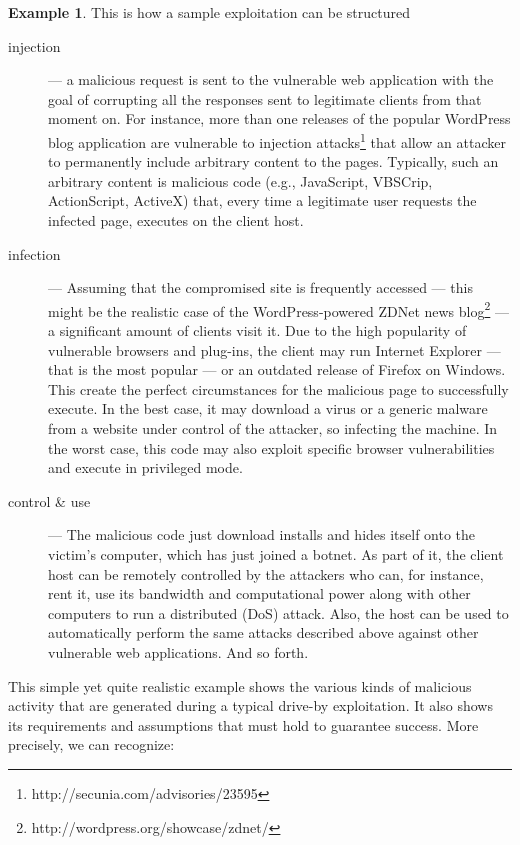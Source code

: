\documentclass[12pt]{article}
\theoremstyle{definition}
\newtheorem{example}{Example}[section]
\begin{document}
		\begin{example}
				This is how a sample exploitation can be structured
				\begin{description}
					\item [injection] --- a malicious request is sent to the vulnerable
					web application with the goal of corrupting all the responses sent
					to legitimate clients from that moment on. For instance, more than
					one releases of the popular \textsf{WordPress} blog application are
					vulnerable to injection
					attacks\footnote{http://secunia.com/advisories/23595} that allow an
					attacker to permanently include arbitrary content to the
					pages. Typically, such an arbitrary content is malicious code (e.g.,
					JavaScript, VBSCrip, ActionScript, ActiveX) that, every time a
					legitimate user requests the infected page, executes on the client
					host.
					\item [infection] --- Assuming that the compromised site is
					frequently accessed --- this might be the realistic case of the
					\textsf{WordPress}-powered \textsf{ZDNet} news
					blog\footnote{http://wordpress.org/showcase/zdnet/} --- a
					significant amount of clients visit it. Due to the high popularity
					of vulnerable browsers and plug-ins, the client may run
					\textsf{Internet Explorer} --- that is the most popular --- or an
					outdated release of \textsf{Firefox} on \textsf{Windows}. This
					create the perfect circumstances for the malicious page to
					successfully execute. In the best case, it may download a virus or a
					generic malware from a website under control of the attacker, so
					infecting the machine. In the worst case, this code may also exploit
					specific browser vulnerabilities and execute in privileged mode.
					\item [control \& use] --- The malicious code just download installs
					and hides itself onto the victim's computer, which has just joined a
					botnet. As part of it, the client host can be remotely controlled by
					the attackers who can, for instance, rent it, use its bandwidth and
					computational power along with other computers to run a distributed
					(DoS) attack. Also, the host can be used to automatically perform
					the same attacks described above against other vulnerable web
					applications. And so forth.
				\end{description}
			\end{example}
		
		This simple yet quite realistic example shows the various kinds of
		malicious activity that are generated during a typical drive-by
		exploitation. It also shows its requirements and assumptions that must
		hold to guarantee success. More precisely, we can recognize:
		
\end{document}
